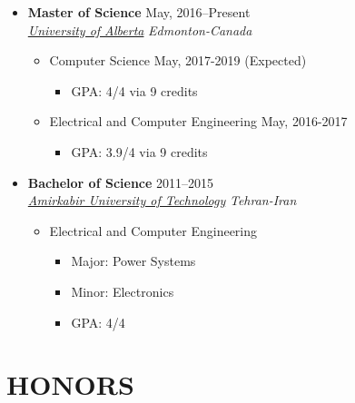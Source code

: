 \begin{itemize}
	\item \textbf{Master of Science} \hfill May, 2016--Present \\ 
	\href{https://ualberta.ca/}{ \emph{University of Alberta}} \hfill \emph{Edmonton-Canada}
	\begin{itemize}
		\item Computer Science \hspace{10 pt}  \hspace{10 pt}  \hfill  May, 2017-2019 (Expected)
		\begin{itemize}
			\item GPA: 4/4 via 9 credits \\
		\end{itemize}
		\item Electrical and Computer Engineering \hspace{10 pt}  \hspace{10 pt}  \hfill  May, 2016-2017 
		\begin{itemize}
			\item GPA: 3.9/4 via 9 credits \\
		\end{itemize}
	\end{itemize}
	
	
	\item \textbf{Bachelor of Science} \hfill 2011--2015 \\
	\href{http://aut.ac.ir/aut/}{ \emph{Amirkabir University of Technology}} \hfill \emph{Tehran-Iran}

	\begin{itemize}
		\item Electrical and Computer Engineering
		\begin{itemize}		
		\item Major: Power Systems \hspace{10 pt} 
		\item Minor: Electronics \hspace{36 pt}   
		\item GPA: 4/4
		\end{itemize}
	\end{itemize}

\end{itemize}
\section{HONORS}

